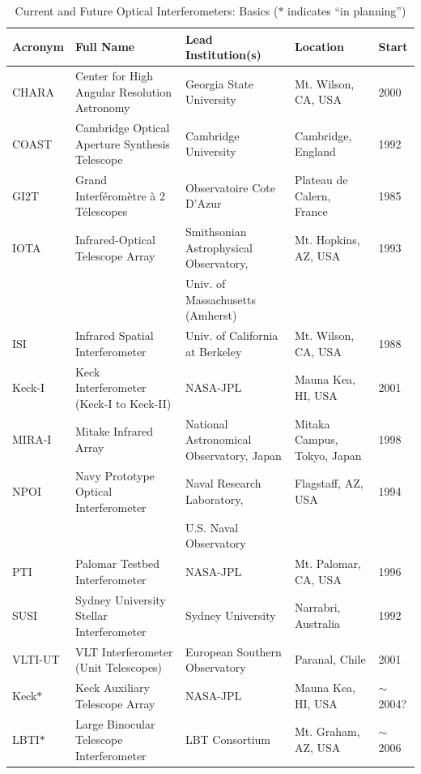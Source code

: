\documentclass[12pt]{iopart}
\begin{document}
\begin{landscape}
\begin{table}

\footnotesize
\caption {Current and Future Optical Interferometers: Basics
($\ast$ indicates ``in planning'')
\label{table:all_interferometers}}
\begin{center}

\begin{tabular}{|l|l|l|l|l|}
\hline
\footnotesize
Acronym & Full Name & Lead Institution(s) & Location & Start \\
\hline
CHARA & Center for High Angular Resolution Astronomy & Georgia State University &
 Mt. Wilson, CA, USA & 2000\\
COAST & Cambridge Optical Aperture Synthesis Telescope & Cambridge University & 
Cambridge, England & 1992 \\
GI2T & Grand Interf{\' e}rom{\` e}tre {\` a} 2 T{\' e}lescopes & Observatoire Cote D'Azur  &
Plateau de Calern, France & 1985 \\
IOTA & Infrared-Optical Telescope Array & Smithsonian Astrophysical Observatory, &
Mt. Hopkins, AZ, USA & 1993 \\
 & & Univ. of Massachusetts (Amherst) & & \\
ISI & Infrared Spatial Interferometer & Univ. of California at Berkeley & Mt. Wilson, CA, USA &
1988 \\
Keck-I & Keck Interferometer (Keck-I to Keck-II) & NASA-JPL & Mauna Kea, HI, USA & 2001 \\
MIRA-I & Mitake Infrared Array & National Astronomical Observatory, Japan & Mitaka Campus,
Tokyo, Japan & 1998 \\ 
NPOI & Navy Prototype Optical Interferometer & Naval Research Laboratory, &
Flagstaff, AZ, USA & 1994 \\
 & & U.S. Naval Observatory & & \\
PTI & Palomar Testbed Interferometer & NASA-JPL & Mt. Palomar, CA, USA & 1996 \\
SUSI & Sydney University Stellar Interferometer & Sydney University & Narrabri, Australia & 1992 \\
VLTI-UT & VLT Interferometer (Unit Telescopes) & European Southern Observatory & Paranal, Chile & 2001 \\
\hline
Keck$\ast$ & Keck Auxiliary Telescope Array & NASA-JPL & Mauna Kea, HI, USA & $\sim$2004? \\
LBTI$\ast$ & Large Binocular Telescope Interferometer& LBT Consortium & Mt. Graham, AZ, USA & $\sim$2006 \\

\end{tabular}
\end{center}
\end{table}
\end{landscape}
\end{document}
